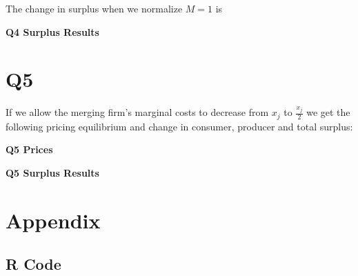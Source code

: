 \documentclass{article}
\newcommand{\1}{\mathbbm{1}}
\begin{document}
The change in surplus when we normalize $M = 1$ is 


\begin{center}
	\centering
	\textbf{Q4 Surplus Results}\par\medskip
	\scalebox{1}{
		
	}
\end{center}

\section{Q5}
If we allow the merging firm's marginal costs to decrease from $x_j$ to $\frac{x_j}{2}$ we get the following pricing equilibrium and change in consumer, producer and total surplus:


\begin{center}
	\centering
	\textbf{Q5 Prices}\par\medskip
	\scalebox{1}{
		
	}
\end{center}

\begin{center}
	\centering
	\textbf{Q5 Surplus Results}\par\medskip
	\scalebox{1}{
		
	}
\end{center}






\section{Appendix}
\subsection{R Code}


\end{document}
